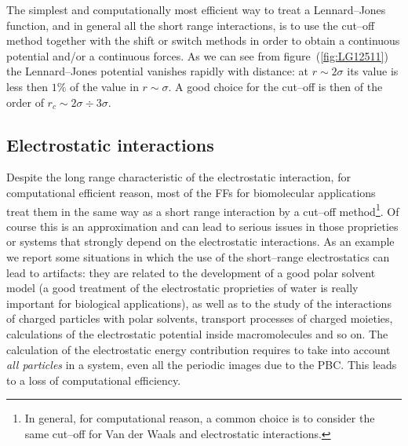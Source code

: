 The simplest and computationally most efficient way to treat a Lennard--Jones function, and in general all the
short range interactions, is to use the cut--off method together with the shift or switch methods in order to
obtain a continuous potential and/or a continuous forces. As we can see from figure~(\ref{fig:LG12511}) the
Lennard--Jones potential vanishes rapidly with distance: at $r \sim 2\sigma$ its value is less then $1\%$ of the
value in $r \sim \sigma$. A good choice for the cut--off is then of the order of $r_c \sim 2\sigma \div 3\sigma$.

\subsection{Electrostatic interactions}
\label{sec:longRangeInt}
Despite the long range characteristic of the electrostatic interaction, for computational efficient reason, most
of the \acp{FF} for biomolecular applications treat them in the same way as a short range interaction by a
cut--off method\footnote{In general, for computational reason, a common choice is to consider the same cut--off
for Van der Waals and electrostatic interactions.}. Of course this is an approximation and can lead to serious
issues in those proprieties or systems that strongly depend on the electrostatic interactions. As an example we
report some situations in which the use of the short--range electrostatics can lead to artifacts: they are
related to the development of a good polar solvent model (a good treatment of the electrostatic proprieties of
water is really important for biological applications), as well as to the study of the interactions of charged
particles with polar solvents, transport processes of charged moieties, calculations of the electrostatic
potential inside macromolecules and so on. The calculation of the electrostatic energy contribution requires to
take into account \textit{all particles} in a system, even all the periodic images due to the \ac{PBC}. This
leads to a loss of computational efficiency.

